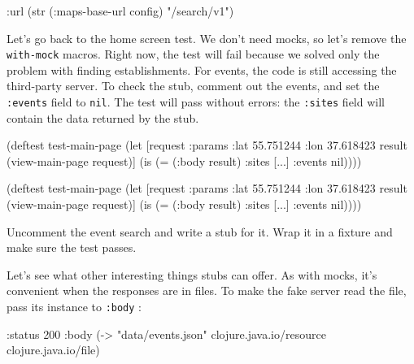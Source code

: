 \else

\begin{english}
  \begin{clojure}
{:url (str (:maps-base-url config) "/search/v1")}
  \end{clojure}
\end{english}

\fi

Let's go back to the home screen test. We don't need mocks, so let's remove the \verb|with-mock| macros. Right now, the test will fail because we solved only the problem with finding establishments. For events, the code is still accessing the third-party server. To check the stub, comment out the events, and set the \verb|:events| field to \verb|nil|. The test will pass without errors: the \verb|:sites| field will contain the data returned by the stub.

\ifnarrow

\begin{english}
  \begin{clojure}
(deftest test-main-page
  (let [request
        {:params {:lat 55.751244
                  :lon 37.618423}}
        result (view-main-page request)]
    (is (= (:body result)
           {:sites [...] :events nil}))))
  \end{clojure}
\end{english}

\else

\begin{english}
  \begin{clojure}
(deftest test-main-page
  (let [request {:params {:lat 55.751244
                          :lon 37.618423}}
        result (view-main-page request)]
    (is (= (:body result) {:sites [...] :events nil}))))
  \end{clojure}
\end{english}

\fi

Uncomment the event search and write a stub for it. Wrap it in a fixture and make sure the test passes.

Let's see what other interesting things stubs can offer. As with mocks, it's convenient when the responses are in files. To make the fake server read the file, pass its instance to \verb|:body| :


\begin{english}
  \begin{clojure}
{:status 200
 :body (-> "data/events.json"
           clojure.java.io/resource
           clojure.java.io/file)}
  \end{clojure}
\end{english}

